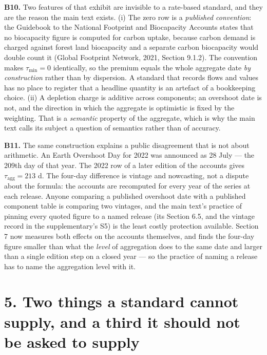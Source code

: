 \documentclass[11pt]{article}
\begin{document}
\textbf{B10.} Two features of that exhibit are invisible to a rate-based standard, and they are the reason the main text exists. (i) The zero row is a \emph{published convention}: the Guidebook to the National Footprint and Biocapacity Accounts states that no biocapacity figure is computed for carbon uptake, because carbon demand is charged against forest land biocapacity and a separate carbon biocapacity would double count it (Global Footprint Network, 2021, Section 9.1.2). The convention makes \(\tau_{\min}=0\) identically, so the premium equals the whole aggregate date \emph{by construction} rather than by dispersion. A standard that records flows and values has no place to register that a headline quantity is an artefact of a bookkeeping choice. (ii) A depletion charge is additive across components; an overshoot date is not, and the direction in which the aggregate is optimistic is fixed by the weighting. That is a \emph{semantic} property of the aggregate, which is why the main text calls its subject a question of semantics rather than of accuracy.

\textbf{B11.} The same construction explains a public disagreement that is not about arithmetic. An Earth Overshoot Day for 2022 was announced as 28 July --- the 209th day of that year. The 2022 row of a later edition of the accounts gives \(\tau_{\mathrm{agg}} = 213\) d. The four-day difference is vintage and nowcasting, not a dispute about the formula: the accounts are recomputed for every year of the series at each release. Anyone comparing a published overshoot date with a published component table is comparing two vintages, and the main text's practice of pinning every quoted figure to a named release (its Section 6.5, and the vintage record in the supplementary's S5) is the least costly protection available. Section 7 now measures both effects on the accounts themselves, and finds the four-day figure smaller than what the \emph{level} of aggregation does to the same date and larger than a single edition step on a closed year --- so the practice of naming a release has to name the aggregation level with it.

\vspace{0.8em}

\section*{5. Two things a standard cannot supply, and a third it should not be asked to supply}\label{5-two-things-a-standard-cannot-supply-and-a-third-it-should-not-be-ask}
\end{document}
